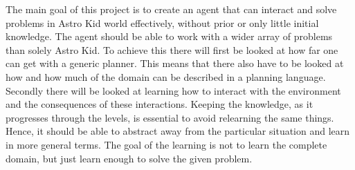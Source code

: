 	The main goal of this project is to create an agent that can interact and solve problems in Astro Kid world effectively, without prior or only little initial knowledge. The agent should be able to work with a wider array of problems than solely Astro Kid. To achieve this there will first be looked at how far one can get with a generic planner. This means that there also have to be looked at how and how much of the domain can be described in a planning language. 	Secondly there will be looked at learning how to interact with the environment and the consequences of these interactions. Keeping the knowledge, as it progresses through the levels, is essential to avoid relearning the same things. Hence, it should be able to abstract away from the particular situation and learn in more general terms.  The goal of the learning is not to learn the complete domain, but just learn enough to solve the given problem. 
%

